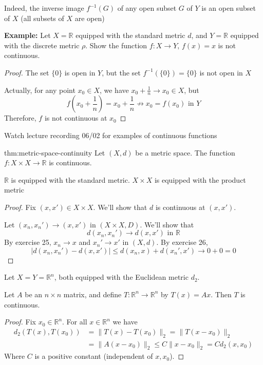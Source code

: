 \documentclass[landscape, 8pt]{extarticle}
\begin{document}
\begin{multicols}{3}
Indeed, the inverse image $f^{-1}(G)$ of any open subset $G$ of $Y$ is an open subset of $X$ (all subsets of $X$ are open)


\textbf{Example: }Let $X = \mathbb{R}$ equipped with the standard metric $d$, and $Y = \mathbb{R}$ equipped with the discrete metric $\rho$. Show the function $f : X \to Y,\, f(x) = x$ is not continuous.

\begin{proof}
    The set $\{0\}$ is open in $Y$, but the set $f^{-1}(\{0\}) = \{0\}$ is not open in $X$

    Actually, for any point $x_{0}\in X$, we have $x_{0} + \frac{1}{n}\to x_{0}\in X$, but
    \[f\left(x_{0} + \frac{1}{n}\right) = x_{0} + \frac{1}{n} \not\to x_{0} = f(x_{0}) \text{ in } Y\]
    Therefore, $f$ is not continuous at $x_{0}$
\end{proof}

Watch lecture recording 06/02 for examples of continuous functions



\begin{thm}{thm:metric-space-continuity}{}
    Let $(X, d)$ be a metric space. The function $f: X \times X \to \mathbb{R} $ is continuous.

    $\mathbb{R}$ is equipped with the standard metric. $X \times X$ is equipped with the product metric
\end{thm}

\begin{proof}
    Fix $(x, x')\in X \times X$. We'll show that $d$ is continuous at $(x, x')$.

    Let $(x_{n}, x_{n}')\to (x, x')$ in $(X \times X, D)$. We'll show that
    \[d(x_{n}, x_{n}')\to d(x,x') \text{ in } \mathbb{R}\]
    By exercise 25, $x_{n}\to x$ and $x_{n}' \to x'$ in $(X, d)$. By exercise 26, 
    \[\lvert d(x_{n}, x_{n}') - d(x,x') \rvert \le d(x_{n},x) + d(x_{n}', x')\to 0 + 0 = 0\]
\end{proof}



Let $X = Y = \mathbb{R}^{n}$, both equipped with the Euclidean metric $d_{2}$.

Let $A$ be an $n \times n$ matrix, and define $T: \mathbb{R}^{n} \to \mathbb{R}^{n} $ by $T(x) = Ax$. Then $T$ is continuous.

\begin{proof}
    Fix $x_{0}\in \mathbb{R}^{n}$. For all $x\in \mathbb{R}^{n}$ we have
    \begin{align*}
        d_{2}(T(x), T(x_{0})) &= \lVert T(x) - T(x_{0}) \rVert_{2} = \lVert T(x - x_{0}) \rVert_{2}\\
                              &= \lVert A(x - x_{0}) \rVert_{2} \le C\lVert x - x_{0} \rVert_{2} = Cd_{2}(x,x_{0})
    \end{align*}
    Where $C$ is a positive constant (independent of $x,x_{0}$).


\end{proof}
\end{multicols}
\end{document}

